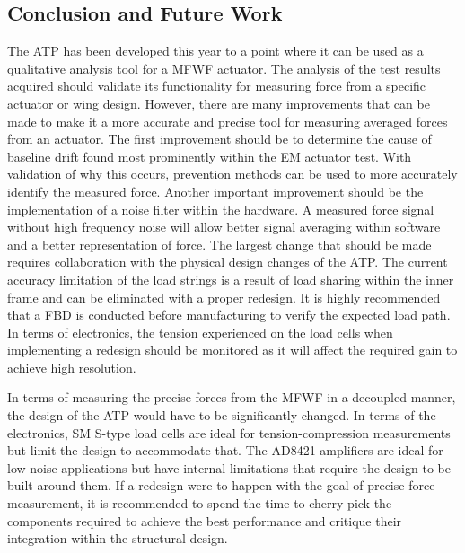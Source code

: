 \subsection{Conclusion and Future Work}
The ATP has been developed this year to a point where it can be used as a qualitative analysis tool for a MFWF actuator. The analysis of the test results acquired should validate its functionality for measuring force from a specific actuator or wing design. However, there are many improvements that can be made to make it a more accurate and precise tool for measuring averaged forces from an actuator. The first improvement should be to determine the cause of baseline drift found most prominently within the EM actuator test. With validation of why this occurs, prevention methods can be used to more accurately identify the measured force. Another important improvement should be the implementation of a noise filter within the hardware. A measured force signal without high frequency noise will allow better signal averaging within software and a better representation of force. The largest change that should be made requires collaboration with the physical design changes of the ATP. The current accuracy limitation of the load strings is a result of load sharing within the inner frame and can be eliminated with a proper redesign. It is highly recommended that a FBD is conducted before manufacturing to verify the expected load path. In terms of electronics, the tension experienced on the load cells when implementing a redesign should be monitored as it will affect the required gain to achieve high resolution.

In terms of measuring the precise forces from the MFWF in a decoupled manner, the design of the ATP would have to be significantly changed. In terms of the electronics, SM S-type load cells are ideal for tension-compression measurements but limit the design to accommodate that. The AD8421 amplifiers are ideal for low noise applications but have internal limitations that require the design to be built around them. If a redesign were to happen with the goal of precise force measurement, it is recommended to spend the time to cherry pick the components required to achieve the best performance and critique their integration within the structural design.

